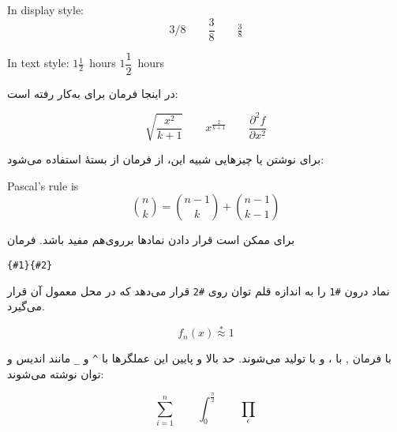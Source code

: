 \begin{example}
In display style:
\[3/8 \qquad \frac{3}{8} 
 \qquad \tfrac{3}{8} \]
\end{example}


\begin{example}
In text style:
$1\frac{1}{2}$~hours \qquad
$1\dfrac{1}{2}$~hours
\end{example}




 
در اینجا فرمان  برای  به‌کار رفته است:
\begin{example}
\[\sqrt{\frac{x^2}{k+1}}\qquad
  x^\frac{2}{k+1}\qquad
  \frac{\partial^2f}
  {\partial x^2} \]
\end{example}

برای نوشتن   یا چیزهایی شبیه این، از فرمان   از بستۀ  استفاده می‌شود:
\begin{example}
Pascal's rule is
\begin{equation*}
 \binom{n}{k} =\binom{n-1}{k}
 + \binom{n-1}{k-1}
\end{equation*}
\end{example}

برای   ممکن است قرار دادن نمادها بر‌روی‌هم مفید باشد. فرمان

\setLR
{}\verb|{#1}{#2}|
\setRL

\noindent
نماد درون \verb|#1| را به اندازه قلم توان روی \verb|#2| قرار می‌دهد که در محل معمول آن قرار می‌گیرد.
\begin{example}
\begin{equation*}
 f_n(x) \stackrel{*}{\approx} 1
\end{equation*}
\end{example}

\textbf{} 
با فرمان , \textbf{} 
با ، و \textbf{} با  تولید می‌شوند. حد بالا و پایین این عملگرها با \verb|^| و \verb|_| مانند اندیس و توان نوشته می‌شوند:
\begin{example}
\begin{equation*}
\sum_{i=1}^n \qquad
\int_0^{\frac{\pi}{2}} \qquad
\prod_\epsilon
\end{equation*}
\end{example}

